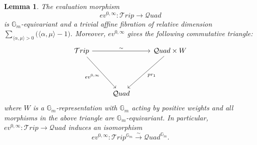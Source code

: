 \documentclass{amsart}
\newcommand{\cQuad}{\mathcal{Q}uad}
\newcommand{\gm}{\mathbb{G}_{m}}
\theoremstyle{plain}
\newtheorem{lemma}[theorem]{Lemma}
\theoremstyle{definition}
\theoremstyle{remark}
\begin{document}
\begin{lemma}\label{quad}
The evaluation morphism
\[
ev^{0,\infty} : \mathcal{T}rip\rightarrow \cQuad
\]
is $\gm$-equivariant and a trivial affine fibration of relative dimension $\sum_{ \langle\alpha,\mu\rangle>0}\Big(\langle\alpha,\mu\rangle-1\Big)$. Moreover, $ev^{0,\infty}$ gives the following commutative triangle:
\[
\begin{tikzcd}[row sep=4.5em, column sep=2.5em]
    \mathcal{T}rip \arrow[rr, "\sim"] \arrow[swap, dr, "ev^{0,\infty}"] & & \cQuad\times W \arrow[dl, "pr_1"] \\
    & \cQuad \\[-4.6em]
\end{tikzcd}
\]
where $W$ is a $\gm$-representation with $\gm$ acting by positive weights and all morphisms in the above triangle are $\gm$-equivariant. In particular, $ev^{0,\infty} : \mathcal{T}rip\rightarrow \cQuad$ induces an isomorphism
\begin{equation}\label{isomorphism}
      ev^{0,\infty} : \mathcal{T}rip^{\gm}\xrightarrow{\sim} \cQuad^{\gm}.
\end{equation}
\end{lemma}
\end{document}
